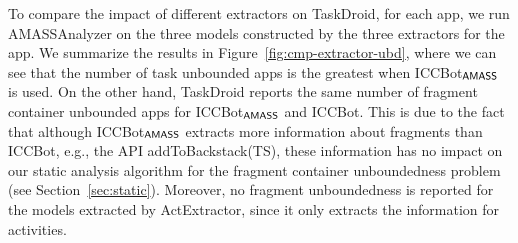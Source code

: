 To compare the impact of different extractors on TaskDroid, for each app, we run {\sf AMASSAnalyzer} on the three models constructed by the three extractors for the app. We summarize the results in Figure~\ref{fig:cmp-extractor-ubd}, where we can see that the number of task unbounded apps is the greatest when ICCBot$_{\textsf{AMASS}}$ is used. 
On the other hand, TaskDroid reports the same number of fragment container unbounded apps for ICCBot$_{\textsf{AMASS}}$ and ICCBot. This is due to the fact that although ICCBot$_{\textsf{AMASS}}$ extracts more information about fragments than ICCBot, e.g., the API addToBackstack(TS), these information has no impact on our static analysis algorithm for the fragment container unboundedness problem (see Section~\ref{sec:static}). Moreover, no fragment unboundedness is reported for the models extracted by ActExtractor, since it only extracts the information for activities. 



